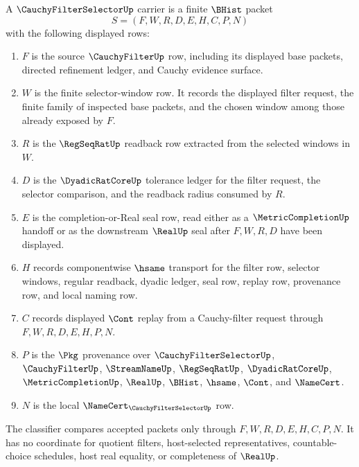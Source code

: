 \begin{definition}
\label{def:cauchy-filter-selector-carrier}
A $\CauchyFilterSelectorUp$ carrier is a finite $\BHist$ packet
$$
S=(F,W,R,D,E,H,C,P,N)
$$
with the following displayed rows:
\begin{enumerate}
\item $F$ is the source $\CauchyFilterUp$ row, including its displayed base packets, directed refinement ledger, and Cauchy evidence surface.
\item $W$ is the finite selector-window row. It records the displayed filter request, the finite family of inspected base packets, and the chosen window among those already exposed by $F$.
\item $R$ is the $\RegSeqRatUp$ readback row extracted from the selected windows in $W$.
\item $D$ is the $\DyadicRatCoreUp$ tolerance ledger for the filter request, the selector comparison, and the readback radius consumed by $R$.
\item $E$ is the completion-or-Real seal row, read either as a $\MetricCompletionUp$ handoff or as the downstream $\RealUp$ seal after $F,W,R,D$ have been displayed.
\item $H$ records componentwise $\hsame$ transport for the filter row, selector windows, regular readback, dyadic ledger, seal row, replay row, provenance row, and local naming row.
\item $C$ records displayed $\Cont$ replay from a Cauchy-filter request through $F,W,R,D,E,H,P,N$.
\item $P$ is the $\Pkg$ provenance over $\CauchyFilterSelectorUp$, $\CauchyFilterUp$, $\StreamNameUp$, $\RegSeqRatUp$, $\DyadicRatCoreUp$, $\MetricCompletionUp$, $\RealUp$, $\BHist$, $\hsame$, $\Cont$, and $\NameCert$.
\item $N$ is the local $\NameCert_{\CauchyFilterSelectorUp}$ row.
\end{enumerate}
The classifier compares accepted packets only through $F,W,R,D,E,H,C,P,N$. It has no coordinate for quotient filters, host-selected representatives, countable-choice schedules, host real equality, or completeness of $\RealUp$.
\end{definition}

